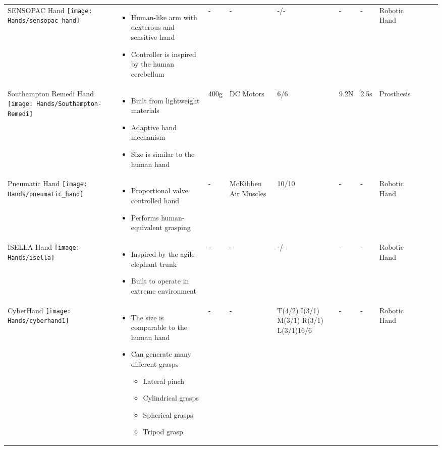 \documentclass[main]{subfiles}
\begin{document}
\begin{longtable}{@{}p{6cm}p{4cm}p{0.7cm}p{1.2cm}p{1cm}p{1cm}p{1cm}p{1cm}p{1cm}p{1cm}p{2cm}@{}}
SENSOPAC Hand \newline
\texttt{[image: Hands/sensopac\_hand]}& 
\begin{itemize}\itemsep0em
\item Human-like arm with dexterous and sensitive hand
\item Controller is inspired by the human cerebellum
\end{itemize} 
& - & - & -/- & - & - & Robotic Hand\\

Southampton Remedi Hand \newline
\texttt{[image: Hands/Southampton-Remedi]}& 
\begin{itemize}\itemsep0em
\item Built from lightweight materials
\item Adaptive hand mechanism
\item Size is similar to the human hand
\end{itemize} 
& 400g & DC Motors & 6/6 & 9.2N & 2.5s  & Prosthesis\\

Pneumatic Hand \newline
\texttt{[image: Hands/pneumatic\_hand]}& 
\begin{itemize}\itemsep0em
\item Proportional valve controlled hand
\item Performs human-equivalent grasping
\end{itemize} 
& - & McKibben Air Muscles & 10/10 & - & - & Robotic Hand\\

ISELLA Hand \newline
\texttt{[image: Hands/isella]}& 
\begin{itemize}\itemsep0em
\item Inspired by the agile elephant trunk
\item Built to operate in extreme environment
\end{itemize} 
& - & - & -/- & - & - & Robotic Hand\\

CyberHand \newline
\texttt{[image: Hands/cyberhand1]}& 
\begin{itemize}\itemsep0em
\item The size is comparable to the human hand
\item Can generate many different grasps
\begin{itemize}\itemsep0em
\item Lateral pinch
\item Cylindrical grasps
\item Spherical grasps
\item Tripod grasp
\end{itemize}
\end{itemize} 
& - & - & T(4/2) I(3/1) M(3/1) R(3/1) L(3/1)16/6 & - & - & Robotic Hand \\


\end{longtable}
\end{document}
